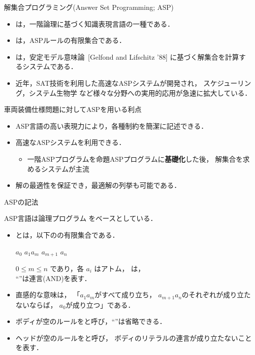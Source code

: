 \documentclass[dvipdfmx, 11pt]{beamer}
\begin{document}
\begin{frame}{解集合プログラミング(Answer Set Programming; ASP)}
 \begin{itemize}
 \item {}は，一階論理に基づく知識表現言語の一種である．
 \item {}は，ASPルールの有限集合である．
 \item {}は，安定モデル意味論~[Gelfond and Lifschitz '88]
   に基づく解集合を計算するシステムである．
 \item 近年，SAT技術を利用した高速なASPシステムが開発され，
   スケジューリング，システム生物学
   など様々な分野への実用的応用が急速に拡大している．
 \end{itemize}
\vfill
 \begin{alertblock}{車両装備仕様問題に対してASPを用いる利点}
   \begin{itemize} 
    \item ASP言語の高い表現力により，各種制約を簡潔に記述できる．
    \item 高速なASPシステムを利用できる．
	  \begin{itemize}
	   \item 一階ASPプログラムを命題ASPプログラムに\alert{\bf 基礎化}した後，
		 解集合を求めるシステムが主流
	  \end{itemize}
    \item 解の最適性を保証でき，最適解の列挙も可能である．
   \end{itemize}
 \end{alertblock}
\end{frame}
\begin{frame}{ASPの記法}
 \begin{alertblock}{}
  ASP言語は論理プログラム\footnotemark
  をベースとしている．
 \end{alertblock}
 \begin{itemize}
  \item {}とは，以下のの有限集合である．
	\begin{center}
	 $a_0$ \code{:-} $a_1$$a_m$ $a_{m+1}$ $a_n$
	\end{center}
  	$0 \leq m \leq n$ であり，各 $a_i$ はアトム，
  	は，\\
  	``\code{,}''は連言(AND)を表す．
  \item \alert{直感的な意味}は，
  	「$a_1$$a_m$がすべて成り立ち，
  	$a_{m+1}$$a_n$のそれぞれが成り立たないならば，
  	$a_0$が成り立つ」である．
  \item ボディが空のルールをと呼び，``\code{:-}''は省略できる．
  \item ヘッドが空のルールをと呼び，
	ボディのリテラルの連言が成り立たないことを表す．
 \end{itemize}
\end{frame}
\end{document}
